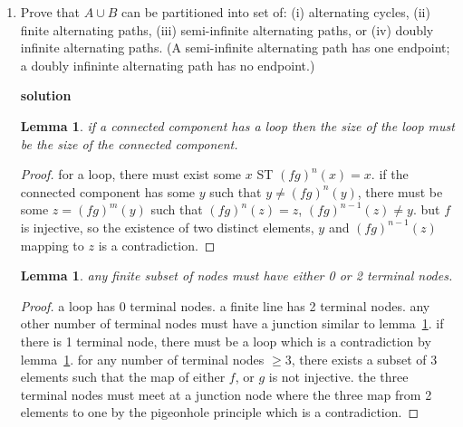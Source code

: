 \documentclass{article}
\newtheorem{lemma}[theorem]{Lemma}
\begin{document}
\begin{enumerate}
\begin{enumerate}
    
                \item Prove that $A \cup B$ can be partitioned into set of: (i) alternating cycles, (ii) finite alternating paths, (iii)
                    semi-infinite alternating paths, or (iv) doubly infinite alternating paths. (A semi-infinite alternating path has one endpoint;
                    a doubly infininte alternating path has no endpoint.)



                

                \textbf{solution}
                
                

                \begin{lemma}\label{lem1}
                    if a connected component has a loop then the size of the loop must be the size of the connected component. 
                \end{lemma}

                \begin{proof}
                    for a loop, there must exist some \(x\) ST \((fg)^n(x)=x\). if the connected component has some \(y\) such that \(y \neq (fg)^n(y)\), there must be some \(z=(fg)^m(y)\) such that \((fg)^n(z)=z\), \((fg)^{n-1}(z)\neq y\). but \(f\) is injective, so the existence of two distinct elements, \(y\) and \((fg)^{n-1}(z)\) mapping to \(z\) is a contradiction.
                \end{proof}

                \begin{lemma}\label{lem2}
                    any finite subset of nodes must have either 0 or 2 terminal nodes.
                \end{lemma}

                \begin{proof}
                    a loop has 0 terminal nodes. a finite line has 2 terminal nodes. any other number of terminal nodes must have a junction similar to lemma~\ref{lem1}. if there is 1 terminal node, there must be a loop which is a contradiction by lemma~\ref{lem1}. for any number of terminal nodes \(\geq 3\), there exists a subset of 3 elements such that the map of either \(f\), or \(g\) is not injective. the three terminal nodes must meet at a junction node where the three map from 2 elements to one by the pigeonhole principle which is a contradiction.
                \end{proof}






\end{enumerate}
\end{enumerate}
\end{document}
